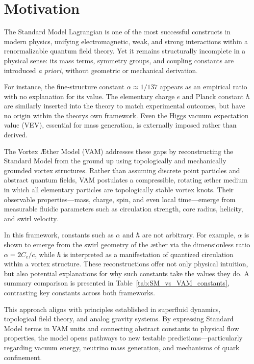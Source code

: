 \section{Motivation}

The Standard Model Lagrangian is one of the most successful constructs in modern physics, unifying electromagnetic, weak, and strong interactions within a renormalizable quantum field theory. Yet it remains structurally incomplete in a physical sense: its mass terms, symmetry groups, and coupling constants are introduced \textit{a priori}, without geometric or mechanical derivation.

For instance, the fine-structure constant $\alpha \approx 1/137$ appears as an empirical ratio with no explanation for its value. The elementary charge $e$ and Planck constant $\hbar$ are similarly inserted into the theory to match experimental outcomes, but have no origin within the theory\rqs s own framework. Even the Higgs vacuum expectation value (VEV), essential for mass generation, is externally imposed rather than derived.

The Vortex Æther Model (VAM) addresses these gaps by reconstructing the Standard Model from the ground up using topologically and mechanically grounded vortex structures. Rather than assuming discrete point particles and abstract quantum fields, VAM postulates a compressible, rotating æther medium in which all elementary particles are topologically stable vortex knots. Their observable properties—mass, charge, spin, and even local time—emerge from measurable fluidic parameters such as circulation strength, core radius, helicity, and swirl velocity.

In this framework, constants such as $\alpha$ and $\hbar$ are not arbitrary. For example, $\alpha$ is shown to emerge from the swirl geometry of the æther via the dimensionless ratio $\alpha = 2C_e / c$, while $\hbar$ is interpreted as a manifestation of quantized circulation within a vortex structure. These reconstructions offer not only physical intuition, but also potential explanations for why such constants take the values they do. A summary comparison is presented in Table~\ref{tab:SM_vs_VAM_constants}, contrasting key constants across both frameworks.

This approach aligns with principles established in superfluid dynamics, topological field theory, and analog gravity systems. By expressing Standard Model terms in VAM units and connecting abstract constants to physical flow properties, the model opens pathways to new testable predictions—particularly regarding vacuum energy, neutrino mass generation, and mechanisms of quark confinement.



